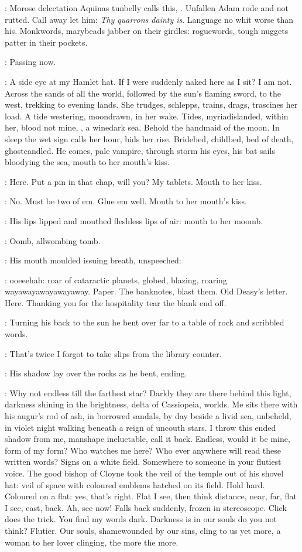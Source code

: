 \StephenInt:
Morose delectation Aquinas tunbelly calls this, .
Unfallen Adam rode and not rutted.
Call away let him:
\emph{Thy quarrons dainty is}.
Language no whit worse than his.
Monkwords, marybeads jabber on their girdles:
roguewords, tough nuggets patter in their pockets.

\StephenInt:
Passing now.

\StephenInt:
A side eye at my Hamlet hat.
If I were suddenly naked here as I sit?
I am not.
Across the sands of all the world,
followed by the sun's flaming sword,
to the west, trekking to evening lands.
She trudges, schlepps,
trains, drags, trascines her load.
A tide westering, moondrawn, in her wake.
Tides, myriadislanded, within her,
blood not mine,
,
a winedark sea.
Behold the handmaid of the moon.
In sleep the wet sign calls her hour, bids her rise.
Bridebed, childbed,
bed of death,
ghostcandled.
He comes, pale vampire, through storm
his eyes, his bat sails bloodying the sea,
mouth to her mouth's kiss.

\StephenInt:
Here.
Put a pin in that chap, will you?
My tablets.
Mouth to her kiss.

\StephenInt:
No.
Must be two of em.
Glue em well.
Mouth to her mouth's kiss.

:
His lips lipped and mouthed fleshless lips of air:
mouth to her moomb.

\StephenInt:
Oomb, allwombing tomb.

:
His mouth moulded issuing breath, unspeeched:

\StephenInt:
ooeeehah:
roar of cataractic planets, globed, blazing,
roaring wayawayawayawayaway.
Paper.
The banknotes, blast them.
Old Deasy's letter.
Here.
Thanking you for the hospitality tear the blank end off.

:
Turning his back to the sun
he bent over far to a table of rock and scribbled words.

\StephenInt:
That's twice I forgot to take slips from the library counter.

:
His shadow lay over the rocks as he bent, ending.

\StephenInt:
Why not endless till the farthest star?
Darkly they are there behind this light,
darkness shining in the brightness,
delta of Cassiopeia, worlds.
Me sits there with his augur's rod of ash,
in borrowed sandals,
by day beside a livid sea,
unbeheld, in violet night
walking beneath a reign of uncouth stars.
I throw this ended shadow from me, manshape ineluctable, call it back.
Endless, would it be mine, form of my form?
Who watches me here?
Who ever anywhere will read these written words?
Signs on a white field.
Somewhere to someone in your flutiest voice.
The good bishop of Cloyne took the veil of the temple
out of his shovel hat:
veil of space with coloured emblems
hatched on its field.
Hold hard.
Coloured on a flat:
yes, that's right.
Flat I see, then think distance,
near, far, flat I see, east, back.
Ah, see now!
Falls back suddenly, frozen in stereoscope.
Click does the trick.
You find my words dark.
Darkness is in our souls do you not think?
Flutier.
Our souls, shamewounded by our sins, cling to us yet more,
a woman to her lover clinging, the more the more.

